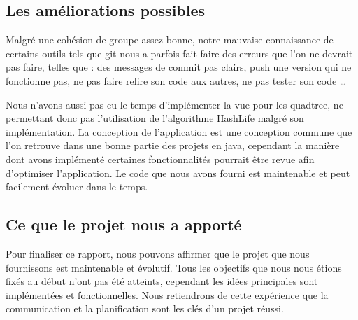 \documentclass[12pt]{article}
\begin{document}
			\subsection{Les améliorations possibles}
			Malgré une cohésion de groupe assez bonne, notre mauvaise connaissance de certains outils tels que git nous a parfois fait faire des erreurs que l’on ne devrait pas faire, telles que : des messages de commit pas clairs, push une version qui ne fonctionne pas, ne pas faire relire son code aux autres, ne pas tester son code …
			
			Nous n’avons aussi pas eu le temps d’implémenter la vue pour les quadtree, ne permettant donc pas l’utilisation de l’algorithme HashLife malgré son implémentation. La conception de l’application est une conception commune que l’on retrouve dans une bonne partie des projets en java, cependant la manière dont avons implémenté certaines fonctionnalités pourrait être revue afin d’optimiser l’application. Le code que nous avons fourni est maintenable et peut facilement évoluer dans le temps.
			
			\subsection{Ce que le projet nous a apporté}
			Pour finaliser ce rapport, nous pouvons affirmer que le projet que nous fournissons est maintenable et évolutif. Tous les objectifs que nous nous étions fixés au début n’ont pas été atteints, cependant les idées principales sont implémentées et fonctionnelles. Nous retiendrons de cette expérience que la communication et la planification sont les clés d’un projet réussi.
			
\end{document}
